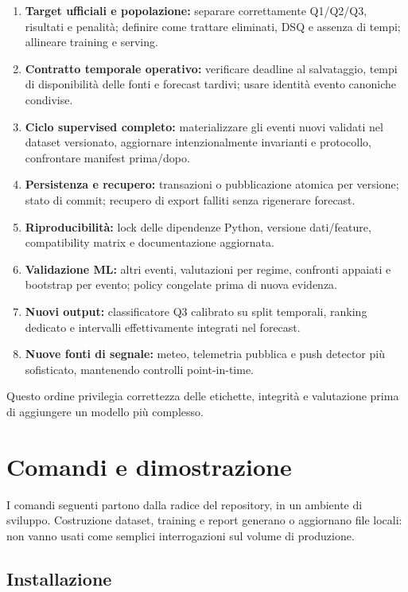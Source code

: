 \documentclass[11pt,a4paper]{article}
\providecommand{\tightlist}{\setlength{\itemsep}{0pt}\setlength{\parskip}{0pt}}
\begin{document}
\begin{enumerate}
\def\labelenumi{\arabic{enumi}.}
\tightlist
\item
  \textbf{Target ufficiali e popolazione:} separare correttamente Q1/Q2/Q3, risultati e penalità; definire come trattare eliminati, DSQ e assenza di tempi; allineare training e serving.
\item
  \textbf{Contratto temporale operativo:} verificare deadline al salvataggio, tempi di disponibilità delle fonti e forecast tardivi; usare identità evento canoniche condivise.
\item
  \textbf{Ciclo supervised completo:} materializzare gli eventi nuovi validati nel dataset versionato, aggiornare intenzionalmente invarianti e protocollo, confrontare manifest prima/dopo.
\item
  \textbf{Persistenza e recupero:} transazioni o pubblicazione atomica per versione; stato di commit; recupero di export falliti senza rigenerare forecast.
\item
  \textbf{Riproducibilità:} lock delle dipendenze Python, versione dati/feature, compatibility matrix e documentazione aggiornata.
\item
  \textbf{Validazione ML:} altri eventi, valutazioni per regime, confronti appaiati e bootstrap per evento; policy congelate prima di nuova evidenza.
\item
  \textbf{Nuovi output:} classificatore Q3 calibrato su split temporali, ranking dedicato e intervalli effettivamente integrati nel forecast.
\item
  \textbf{Nuove fonti di segnale:} meteo, telemetria pubblica e push detector più sofisticato, mantenendo controlli point-in-time.
\end{enumerate}

Questo ordine privilegia correttezza delle etichette, integrità e valutazione prima di aggiungere un modello più complesso.

\section{Comandi e dimostrazione}\label{comandi-e-dimostrazione}

I comandi seguenti partono dalla radice del repository, in un ambiente di sviluppo. Costruzione dataset, training e report generano o aggiornano file locali: non vanno usati come semplici interrogazioni sul volume di produzione.

\subsection{Installazione}\label{installazione}
\end{document}
